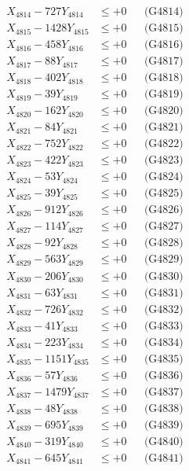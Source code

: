 \documentclass[a4paper,10pt]{article}
\begin{document}
{\begin{align}
X_{4814} - 727Y_{4814} &\leq +0 && \text{(G4814)} \\
X_{4815} - 1428Y_{4815} &\leq +0 && \text{(G4815)} \\
X_{4816} - 458Y_{4816} &\leq +0 && \text{(G4816)} \\
X_{4817} - 88Y_{4817} &\leq +0 && \text{(G4817)} \\
X_{4818} - 402Y_{4818} &\leq +0 && \text{(G4818)} \\
X_{4819} - 39Y_{4819} &\leq +0 && \text{(G4819)} \\
X_{4820} - 162Y_{4820} &\leq +0 && \text{(G4820)} \\
\allowbreak
X_{4821} - 84Y_{4821} &\leq +0 && \text{(G4821)} \\
X_{4822} - 752Y_{4822} &\leq +0 && \text{(G4822)} \\
X_{4823} - 422Y_{4823} &\leq +0 && \text{(G4823)} \\
X_{4824} - 53Y_{4824} &\leq +0 && \text{(G4824)} \\
X_{4825} - 39Y_{4825} &\leq +0 && \text{(G4825)} \\
X_{4826} - 912Y_{4826} &\leq +0 && \text{(G4826)} \\
X_{4827} - 114Y_{4827} &\leq +0 && \text{(G4827)} \\
X_{4828} - 92Y_{4828} &\leq +0 && \text{(G4828)} \\
X_{4829} - 563Y_{4829} &\leq +0 && \text{(G4829)} \\
X_{4830} - 206Y_{4830} &\leq +0 && \text{(G4830)} \\
\allowbreak
X_{4831} - 63Y_{4831} &\leq +0 && \text{(G4831)} \\
X_{4832} - 726Y_{4832} &\leq +0 && \text{(G4832)} \\
X_{4833} - 41Y_{4833} &\leq +0 && \text{(G4833)} \\
X_{4834} - 223Y_{4834} &\leq +0 && \text{(G4834)} \\
X_{4835} - 1151Y_{4835} &\leq +0 && \text{(G4835)} \\
X_{4836} - 57Y_{4836} &\leq +0 && \text{(G4836)} \\
X_{4837} - 1479Y_{4837} &\leq +0 && \text{(G4837)} \\
X_{4838} - 48Y_{4838} &\leq +0 && \text{(G4838)} \\
X_{4839} - 695Y_{4839} &\leq +0 && \text{(G4839)} \\
X_{4840} - 319Y_{4840} &\leq +0 && \text{(G4840)} \\
\allowbreak
X_{4841} - 645Y_{4841} &\leq +0 && \text{(G4841)} \\

\end{align}}
\end{document}
